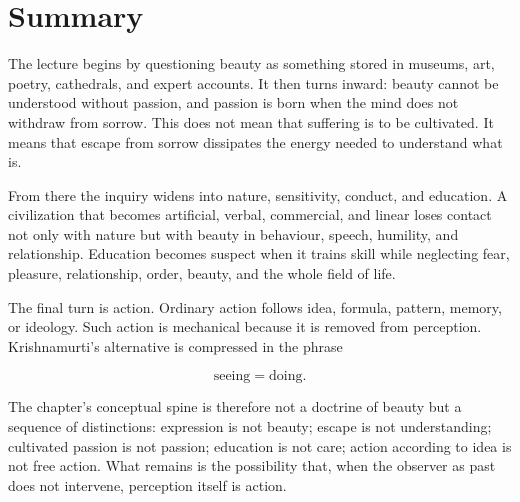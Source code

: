 \section{Summary}

The lecture begins by questioning beauty as something stored in museums, art, poetry, cathedrals, and expert accounts. It then turns inward: beauty cannot be understood without passion, and passion is born when the mind does not withdraw from sorrow. This does not mean that suffering is to be cultivated. It means that escape from sorrow dissipates the energy needed to understand what is.

From there the inquiry widens into nature, sensitivity, conduct, and education. A civilization that becomes artificial, verbal, commercial, and linear loses contact not only with nature but with beauty in behaviour, speech, humility, and relationship. Education becomes suspect when it trains skill while neglecting fear, pleasure, relationship, order, beauty, and the whole field of life.

The final turn is action. Ordinary action follows idea, formula, pattern, memory, or ideology. Such action is mechanical because it is removed from perception. Krishnamurti's alternative is compressed in the phrase

\begin{equation}
\text{seeing} = \text{doing}.
\end{equation}

The chapter's conceptual spine is therefore not a doctrine of beauty but a sequence of distinctions: expression is not beauty; escape is not understanding; cultivated passion is not passion; education is not care; action according to idea is not free action. What remains is the possibility that, when the observer as past does not intervene, perception itself is action.